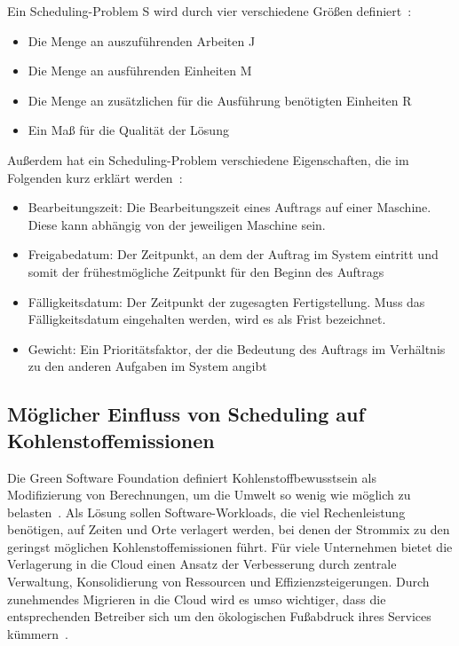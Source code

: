 Ein Scheduling-Problem S wird durch vier verschiedene Größen definiert~\cite{Gawiejnowicz.2020}:
\begin{itemize}
 \item Die Menge an auszuführenden Arbeiten J
 \item Die Menge an ausführenden Einheiten M
 \item Die Menge an zusätzlichen für die Ausführung benötigten Einheiten R
 \item Ein Maß für die Qualität der Lösung %
\end {itemize}
Außerdem hat ein Scheduling-Problem verschiedene Eigenschaften, die im Folgenden kurz erklärt werden~\cite{Pinedo.2022}:
\begin{itemize}
 \item Bearbeitungszeit: Die Bearbeitungszeit eines Auftrags auf einer Maschine. Diese kann abhängig von der jeweiligen Maschine sein.
 \item Freigabedatum: Der Zeitpunkt, an dem der Auftrag im System eintritt und somit der frühestmögliche Zeitpunkt für den Beginn des Auftrags
 \item Fälligkeitsdatum: Der Zeitpunkt der zugesagten Fertigstellung. Muss das Fälligkeitsdatum eingehalten werden, wird es als Frist bezeichnet.
 \item Gewicht: Ein Prioritätsfaktor, der die Bedeutung des Auftrags im Verhältnis zu den anderen Aufgaben im System angibt
\end{itemize}

\subsection{Möglicher Einfluss von Scheduling auf Kohlenstoffemissionen}
Die Green Software Foundation definiert Kohlenstoffbewusstsein als Modifizierung von Berechnungen, um die Umwelt so wenig wie möglich zu belasten~\cite{GreenSoftwareFoundation.2022}.
Als Lösung sollen Software-Workloads, die viel Rechenleistung benötigen, auf Zeiten und Orte verlagert werden, bei denen der Strommix zu den geringst möglichen Kohlenstoffemissionen führt.
Für viele Unternehmen bietet die Verlagerung in die Cloud einen Ansatz der Verbesserung durch zentrale Verwaltung, Konsolidierung von Ressourcen und Effizienzsteigerungen.
Durch zunehmendes Migrieren in die Cloud wird es umso wichtiger, dass die entsprechenden Betreiber sich um den ökologischen Fußabdruck ihres Services kümmern~\cite{Buchanan.2023}.

